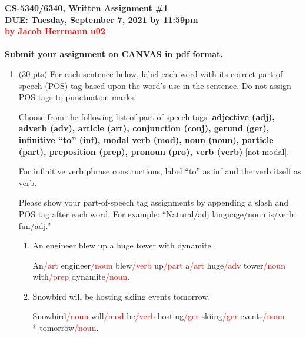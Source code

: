 \documentclass[11pt]{article}
\begin{document}
\large
\begin{center}
{\bf CS-5340/6340, Written Assignment \#1} \\
{\bf DUE: Tuesday, September 7, 2021 by 11:59pm} \\
{\bf  \textcolor{red}{by Jacob Herrmann u02}}\\ ~ \\
{\bf  Submit your assignment on CANVAS in pdf format.}
\end{center}
\normalsize

\begin{enumerate}  


\item (30 pts) For each sentence below, label each word with its
  correct part-of-speech (POS) tag based upon the word's use in the sentence.
  Do not assign POS tags to punctuation marks. 

  Choose from the following list of part-of-speech tags: {\bf
    adjective ({\sc adj}), adverb ({\sc adv}), article ({\sc art}),
    conjunction ({\sc conj}), gerund ({\sc ger}), infinitive ``to''
    ({\sc inf}), modal verb ({\sc mod}), noun ({\sc noun}), particle
    ({\sc part}), preposition ({\sc prep}), 
    pronoun ({\sc pro}), 
    verb ({\sc verb})} [not modal]. 

For infinitive verb phrase constructions, label ``to'' as {\sc inf}
and the verb itself as {\sc verb}. \par

Please show your part-of-speech tag assignments by appending a
slash and POS tag after each word. For example: ``Natural/{\sc adj}
language/{\sc noun} is/{\sc verb} fun/{\sc adj}.'' 

\begin{enumerate}

\item An engineer blew up a huge tower with dynamite.
\par An\textcolor{red}{{/\sc art}} engineer\textcolor{red}{{/\sc noun}} blew\textcolor{red}{{/\sc verb}} up\textcolor{red}{{/\sc part}} a\textcolor{red}{{/\sc art}} huge\textcolor{red}{{/\sc adv}} tower\textcolor{red}{{/\sc noun}} with\textcolor{red}{{/\sc prep}} dynamite\textcolor{red}{{/\sc noun}}.

\item Snowbird will be hosting skiing events tomorrow.
\par Snowbird\textcolor{red}{{/\sc noun}} will\textcolor{red}{{/\sc mod}} be\textcolor{red}{{/\sc verb}} hosting\textcolor{red}{{/\sc ger}} skiing\textcolor{red}{{/\sc ger}} events\textcolor{red}{{/\sc noun}}\\* tomorrow\textcolor{red}{{/\sc noun}}.


\end{enumerate}
\end{enumerate}
\end{document}
